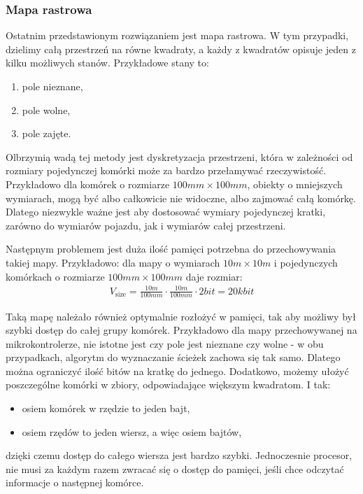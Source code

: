         \subsubsection{Mapa rastrowa}
            Ostatnim przedstawionym rozwiązaniem jest mapa rastrowa.
            W tym przypadki, dzielimy całą przestrzeń na równe kwadraty, a każdy z kwadratów opisuje jeden z kilku możliwych stanów.
            Przykładowe stany to:
            \begin{enumerate}
                \item pole nieznane,
                \item pole wolne,
                \item pole zajęte.
            \end{enumerate}

            Olbrzymią wadą tej metody jest dyskretyzacja przestrzeni, która w zależności od rozmiary pojedynczej komórki może za bardzo przełamywać rzeczywistość.
            Przykładowo dla komórek o rozmiarze $100mm \times 100mm$, obiekty o mniejszych wymiarach, mogą być albo całkowicie nie widoczne, albo zajmować całą komórkę.
            Dlatego niezwykle ważne jest aby dostosować wymiary pojedynczej kratki, zarówno do wymiarów pojazdu, jak i wymiarów całej przestrzeni.

            Następnym problemem jest duża ilość pamięci potrzebna do przechowywania takiej mapy.
            Przykładowo: dla mapy o wymiarach $10m \times 10m$ i pojedynczych komórkach o rozmiarze $100mm \times 100mm$ daje rozmiar:
            \begin{gather}
                V_{\text{size}} = \frac{10m}{100mm} \cdot \frac{10m}{100mm} \cdot 2bit = 20kbit
            \end{gather}

            Taką mapę należało również optymalnie rozłożyć w pamięci, tak aby możliwy był szybki dostęp do całej grupy komórek.
            Przykładowo dla mapy przechowywanej na mikrokontrolerze, nie istotne jest czy pole jest nieznane czy wolne - w obu przypadkach, algorytm do wyznaczanie ścieżek zachowa się tak samo.
            Dlatego można ograniczyć ilość bitów na kratkę do jednego.
            Dodatkowo, możemy ułożyć poszczególne komórki w zbiory, odpowiadające większym kwadratom.
            I tak:
            \begin{itemize}[label = -]
                \item osiem komórek w rzędzie to jeden bajt,
                \item osiem rzędów to jeden wiersz, a więc osiem bajtów,
            \end{itemize}
            dzięki czemu dostęp do całego wiersza jest bardzo szybki.
            Jednoczesnie procesor, nie musi za każdym razem zwracać się o dostęp do pamięci, jeśli chce odczytać informacje o następnej komórce.


